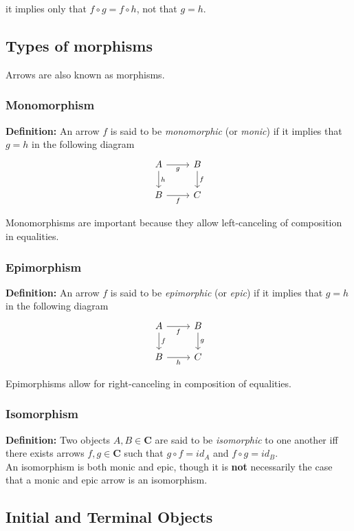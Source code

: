 \documentclass[]{article}
\newcommand{\what}{}
\newcommand{\cat}[1]{\mathbf{#1}}
\newcommand{\defn}[2]{
\renewcommand{\what}{\textit{#1} }
\textbf{Definition:} #2\\
}
\newcommand{\cdr}[1]{\arrow[swap]{r}{#1}}
\newcommand{\cdd}[1]{\arrow{d}{#1}}
\begin{document}
it implies only that $f \circ g = f \circ h$, not that $g = h$.


\subsection{Types of morphisms}

Arrows are also known as morphisms.

\subsubsection{Monomorphism}

\defn{monomorphic}{
    An arrow $f$ is said to be \what (or \textit{monic}) if it implies that $g = h$ in the following diagram
}
$$\begin{tikzcd}
A \cdr{g} \cdd{h} & B \cdd{f} \\
B \cdr{f} & C
\end{tikzcd}$$

Monomorphisms are important because they allow left-canceling of composition in equalities.

\subsubsection{Epimorphism}

\defn{epimorphism}{
    An arrow $f$ is said to be \textit{epimorphic} (or \textit{epic}) if it implies that $g = h$ in the following
    diagram
}
$$\begin{tikzcd}
A \cdr{f} \cdd{f} & B \cdd{g} \\
B \cdr{h} & C
\end{tikzcd}$$

Epimorphisms allow for right-canceling in composition of equalities.

\subsubsection{Isomorphism}

\defn{isomorphism}{
    Two objects $A, B \in \cat{C}$ are said to be \textit{isomorphic} to one another iff there exists arrows $f, g \in
    \cat{C}$ such that $g\circ f = id_A$ and $f\circ g = id_B$.
}

An isomorphism is both monic and epic, though it is \textbf{not} necessarily the case that a monic and epic arrow is an
isomorphism.


\subsection{Initial and Terminal Objects}
\end{document}

